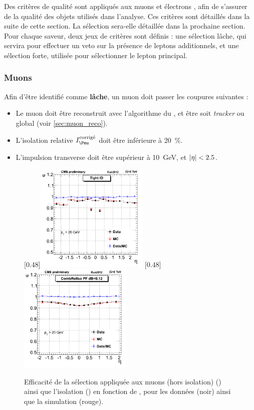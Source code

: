 Des critères de qualité sont appliqués aux muons et électrons \pf, afin de s'assurer de la qualité des objets utilisés dans l'analyse. Ces critères sont détaillés dans la suite de cette section. La sélection sera-elle détaillée dans la prochaine section. Pour chaque saveur, deux jeux de critères sont définis : une sélection lâche, qui servira pour effectuer un veto sur la présence de leptons additionnels, et une sélection forte, utilisée pour sélectionner le lepton principal.

\subsubsection{Muons} \label{sec:sel_muon}

Afin d'être identifié comme \textbf{lâche}, un muon doit passer les coupures suivantes :
\begin{itemize}
    \item Le muon doit être reconstruit avec l'algorithme du \pf, et être soit \emph{tracker} ou global (voir \cref{sec:muon_reco}).
    \item L'isolation relative $I_{\Pmu}^\text{corrigé}$ doit être inférieure à \SI{20}{\%}.
    \item L'impulsion transverse doit être supérieur à \SI{10}{\GeV}, et $\lvert \eta \rvert < \num{2.5}$.
\end{itemize}

\begin{figure}[tbp] \centering
    \subcaptionbox{\label{fig:muon_id_eff}}[0.48\textwidth]{\includegraphics[width=0.48\textwidth]{chapitre7/figs/muon_id_efficiency.png}} \hfill
    \subcaptionbox{\label{fig:muon_iso_eff}}[0.48\textwidth]{\includegraphics[width=0.48\textwidth]{chapitre7/figs/muon_iso_efficiency.png}}
    \caption{Efficacité de la sélection appliquée aux muons (hors isolation) () ainsi que l'isolation () en fonction de \aeta, pour les données (noir) ainsi que la simulation (rouge).}
\end{figure}

